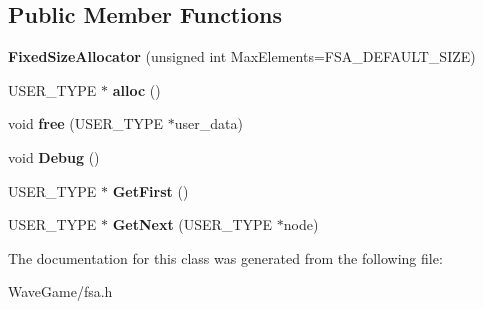 \subsection*{Public Member Functions}
\begin{DoxyCompactItemize}
\item 
\mbox{\label{class_fixed_size_allocator_ae5c456344d0c741b01c9441573159586}} 
{\bfseries Fixed\+Size\+Allocator} (unsigned int Max\+Elements=F\+S\+A\+\_\+\+D\+E\+F\+A\+U\+L\+T\+\_\+\+S\+I\+ZE)
\item 
\mbox{\label{class_fixed_size_allocator_ac48055f3218de0c25caa71312ddd71a0}} 
U\+S\+E\+R\+\_\+\+T\+Y\+PE $\ast$ {\bfseries alloc} ()
\item 
\mbox{\label{class_fixed_size_allocator_a2c8cfe0b5c46c9e11baf09a86f369b58}} 
void {\bfseries free} (U\+S\+E\+R\+\_\+\+T\+Y\+PE $\ast$user\+\_\+data)
\item 
\mbox{\label{class_fixed_size_allocator_afec18245a3195a6aaad728f371abc4a9}} 
void {\bfseries Debug} ()
\item 
\mbox{\label{class_fixed_size_allocator_a483c3ae6aa4869a622f018a1bb7de4b7}} 
U\+S\+E\+R\+\_\+\+T\+Y\+PE $\ast$ {\bfseries Get\+First} ()
\item 
\mbox{\label{class_fixed_size_allocator_abc6a00b10f0853c011b7b0105293165a}} 
U\+S\+E\+R\+\_\+\+T\+Y\+PE $\ast$ {\bfseries Get\+Next} (U\+S\+E\+R\+\_\+\+T\+Y\+PE $\ast$node)
\end{DoxyCompactItemize}


The documentation for this class was generated from the following file\+:\begin{DoxyCompactItemize}
\item 
Wave\+Game/fsa.\+h\end{DoxyCompactItemize}

